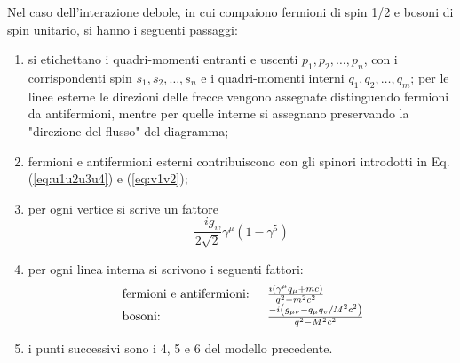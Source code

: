 \documentclass{subnucbo}
\begin{document}
Nel caso dell'interazione debole, in cui compaiono fermioni di spin 1/2 e bosoni di spin unitario, si hanno i seguenti passaggi:
\begin{enumerate}
        \item si etichettano i quadri-momenti entranti e uscenti $p_{1}, p_{2}, \ldots, p_{n}$, con i corrispondenti spin $s_{1}, s_{2}, \ldots, s_{n}$ e i quadri-momenti interni $q_{1}, q_{2}, \ldots, q_{m}$; per le linee esterne le direzioni delle frecce vengono assegnate distinguendo fermioni da antifermioni, mentre per quelle interne si assegnano preservando la "direzione del flusso" del diagramma;
        \item fermioni e antifermioni esterni contribuiscono con gli spinori introdotti in Eq. (\ref{eq:u1u2u3u4}) e (\ref{eq:v1v2});
        \item per ogni vertice si scrive un fattore
                \begin{equation}
                        \frac { - i g _ { w } } { 2 \sqrt { 2 } } \gamma ^ { \mu } \left( 1 - \gamma ^ { 5 } \right)
                \end{equation}
        \item per ogni linea interna si scrivono i seguenti fattori:
                \begin{equation}
                        \begin{array} { l l } { \text { fermioni e antifermioni: } } & { \frac { i \left( \gamma ^ { \mu } q _ { \mu } + m c \right) } { q ^ { 2 } - m ^ { 2 } c ^ { 2 } } } \\ { \text { bosoni: } } & { \frac{- i \left( g _ { \mu \nu } - q _ { \mu } q _ { v } / M ^ { 2 } c ^ { 2 } \right)}{ q ^ { 2 } - M ^ { 2 } c ^ { 2 }  }   }\\ \end{array}
                \end{equation}
        \item i punti successivi sono i 4, 5 e 6 del modello precedente.
\end{enumerate}
\end{document}
